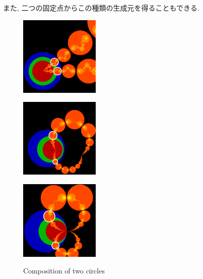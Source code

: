 また, 二つの固定点からこの種類の生成元を得ることもできる.

\begin{figure}[htbp]
 \begin{minipage}[]{0.65\hsize}
  \begin{minipage}[]{0.22\hsize}
   \center
   \includegraphics[width=1.5in, height=1.5in, keepaspectratio]{../img/klein/2diis/scalingEdged.pdf}
   \label{fig:scaling2d}
  \end{minipage}
 \hspace*{\fill}
  \begin{minipage}[]{0.22\hsize}
   \center
   \includegraphics[width=1.5in, height=1.5in, keepaspectratio]{../img/klein/2diis/hyperbolicEdged.pdf}
   \label{fig:hyperbolic2d}
  \end{minipage}
 \hspace*{\fill}
  \begin{minipage}[]{0.22\hsize}
   \center
   \includegraphics[width=1.5in, height=1.5in, keepaspectratio]{../img/klein/2diis/parabolicEdged.pdf}
   \label{fig:parabolic2d}
  \end{minipage}
  \caption{Composition of two circles}
 \end{minipage}
 \hspace*{\fill}

\end{figure}
